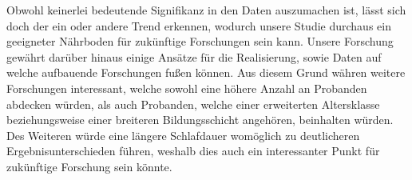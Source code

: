 Obwohl keinerlei bedeutende Signifikanz in den Daten auszumachen ist, lässt sich doch der ein oder andere Trend erkennen, wodurch unsere Studie durchaus ein geeigneter Nährboden für zukünftige Forschungen sein kann. 
Unsere Forschung gewährt darüber hinaus einige Ansätze für die Realisierung, sowie Daten auf welche aufbauende Forschungen fußen können. 
Aus diesem Grund währen weitere Forschungen interessant, welche sowohl eine höhere Anzahl an Probanden abdecken würden, als auch Probanden, welche einer erweiterten Altersklasse beziehungsweise einer breiteren Bildungsschicht angehören, beinhalten würden. 
Des Weiteren würde eine längere Schlafdauer womöglich zu deutlicheren Ergebnisunterschieden führen, weshalb dies auch ein interessanter Punkt für zukünftige Forschung sein könnte.

